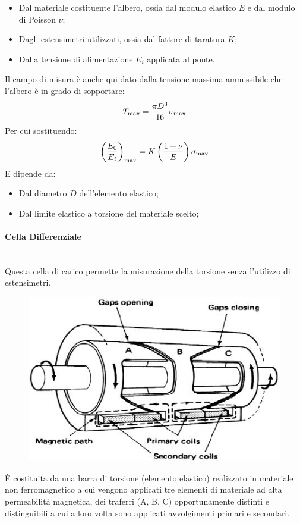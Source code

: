 \documentclass[a4paper, 15pt]{article}
\begin{document}
\begin{adjustwidth}{2in}{}
\begin{itemize}
 			\item Dal materiale costituente l'albero, ossia dal modulo elastico $ E $ e dal modulo di Poisson $\nu$;
 			
 			\item Dagli estensimetri utilizzati, ossia dal fattore di
 			taratura $ K $;
 			
 			\item Dalla tensione di alimentazione $E_i$ applicata al ponte.	
 		\end{itemize}
 	
 		Il campo di misura è anche qui dato dalla tensione massima ammissibile che l'albero è in grado di sopportare: 
 		\[T_{\max} = {\pi D^3\over 16}\sigma_{\text{max}}\] 
 	 	Per cui sostituendo: 
 	 	\[\left(E_0\over E_i\right)_{\max} = K\left(1+\nu\over E\right)\sigma_{\text{max}}\]
 	 	E dipende da:
 	 	\begin{itemize}
 	 		\item Dal diametro $D$ dell'elemento elastico;
 	 		\item Dal limite elastico a torsione del materiale scelto; 
 	 	\end{itemize}  	
\paragraph{Cella Differenziale} \mbox{} \\ 
  		Questa cella di carico permette la misurazione della torsione senza l'utilizzo di estensimetri.  		
  		\begin{figure}[H]
  			\centering
  			\includegraphics[width=0.5\linewidth]{immagini/20}
  			\label{fig:20}
  		\end{figure}  		
  		È costituita da una barra di torsione (elemento elastico) realizzato in materiale non ferromagnetico a cui vengono applicati tre elementi di materiale ad alta permeabilità magnetica, dei traferri (A, B, C) opportunamente distinti e distinguibili a cui a loro volta sono applicati avvolgimenti primari e secondari. \newline 
  		

\end{adjustwidth}
\end{document}
